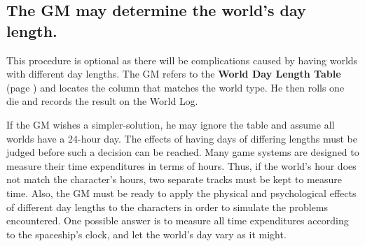 \subsection[Day Length]{The GM may determine the world's day
  length.}
\label{sec:day-length}

This procedure is optional as there will be complications caused by
having worlds with different day lengths. The GM refers to the \textbf{World
Day Length Table} (page \pageref{tab:world-day-length}) and locates
the column that matches the 
world type. He then rolls one die and records the result on the World
Log.

If the GM wishes a simpler-solution, he may ignore the table and
assume all worlds have a 24-hour day. The effects of having days of
differing lengths must be judged before such a decision can be
reached. Many game systems are designed to measure their time
expenditures in terms of hours. Thus, if the world's hour does not
match the character's hours, two separate tracks must be kept to
measure time. Also, the GM must be ready to apply the physical and
psychological effects of different day lengths to the characters in
order to simulate the problems encountered. One possible answer is to
measure all time expenditures according to the spaceship's clock, and
let the world's day vary as it might.


